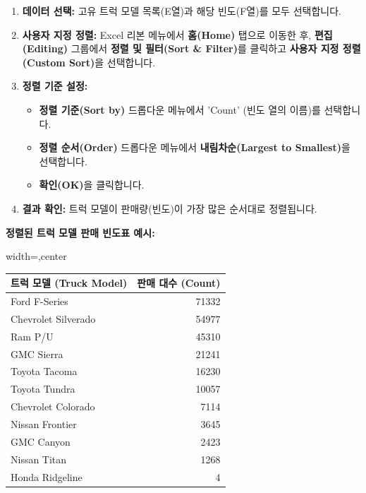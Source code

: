 \documentclass[11pt,a4paper]{article}
\begin{document}
\begin{enumerate}
    \item \textbf{데이터 선택:} 고유 트럭 모델 목록(E열)과 해당 빈도(F열)를 모두 선택합니다.
    \item \textbf{사용자 지정 정렬:} Excel 리본 메뉴에서 \textbf{홈(Home)} 탭으로 이동한 후, \textbf{편집(Editing)} 그룹에서 \textbf{정렬 및 필터(Sort \& Filter)}를 클릭하고 \textbf{사용자 지정 정렬(Custom Sort)}을 선택합니다.
    \item \textbf{정렬 기준 설정:}
    \begin{itemize}
        \item \textbf{정렬 기준(Sort by)} 드롭다운 메뉴에서 'Count' (빈도 열의 이름)를 선택합니다.
        \item \textbf{정렬 순서(Order)} 드롭다운 메뉴에서 \textbf{내림차순(Largest to Smallest)}을 선택합니다.
        \item \textbf{확인(OK)}을 클릭합니다.
    \end{itemize}
    \item \textbf{결과 확인:} 트럭 모델이 판매량(빈도)이 가장 많은 순서대로 정렬됩니다.
\end{enumerate}

\begin{examplebox}
\textbf{정렬된 트럭 모델 판매 빈도표 예시:}
\begin{adjustbox}{width=\textwidth,center}
\begin{tabular}{lr}
\toprule
\textbf{트럭 모델 (Truck Model)} & \textbf{판매 대수 (Count)} \\
\midrule
Ford F-Series & 71332 \\
Chevrolet Silverado & 54977 \\
Ram P/U & 45310 \\
GMC Sierra & 21241 \\
Toyota Tacoma & 16230 \\
Toyota Tundra & 10057 \\
Chevrolet Colorado & 7114 \\
Nissan Frontier & 3645 \\
GMC Canyon & 2423 \\
Nissan Titan & 1268 \\
Honda Ridgeline & 4 \\
\bottomrule
\end{tabular}
\end{adjustbox}
\end{examplebox}
\end{document}
